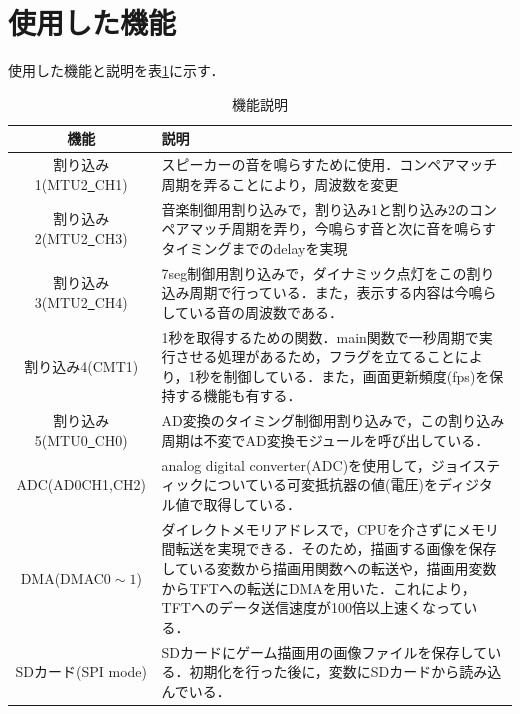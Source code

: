 \documentclass[a4paper,11pt]{ltjsarticle}
\begin{document}
\section{使用した機能}
使用した機能と説明を表\ref{tab:table1}に示す．
\begin{table}[htbp]
  \centering
  \caption{機能説明}
  \label{tab:table1}
  \begin{tabular}{|c|p{10cm}|}
    \hline
    機能                          & 説明                                                                                                                           \\
    \hline
    割り込み1(MTU2\underline{~}CH1) & スピーカーの音を鳴らすために使用．コンペアマッチ周期を弄ることにより，周波数を変更                                                                                    \\
    \hline
    割り込み2(MTU2\underline{~}CH3) & 音楽制御用割り込みで，割り込み1と割り込み2のコンペアマッチ周期を弄り，今鳴らす音と次に音を鳴らすタイミングまでのdelayを実現                                                            \\
    \hline
    割り込み3(MTU2\underline{~}CH4) & 7seg制御用割り込みで，ダイナミック点灯をこの割り込み周期で行っている．また，表示する内容は今鳴らしている音の周波数である．                                                              \\
    \hline
    割り込み4(CMT1)                 & 1秒を取得するための関数．main関数で一秒周期で実行させる処理があるため，フラグを立てることにより，1秒を制御している．また，画面更新頻度(fps)を保持する機能も有する．                                      \\
    \hline
    割り込み5(MTU0\underline{~}CH0) & AD変換のタイミング制御用割り込みで，この割り込み周期は不変でAD変換モジュールを呼び出している．                                                                            \\
    \hline
    ADC(AD0\underbar{~}CH1,CH2) & analog digital converter(ADC)を使用して，ジョイスティックについている可変抵抗器の値(電圧)をディジタル値で取得している．                                                  \\
    \hline
    DMA(DMAC$0 \sim 1$)         & ダイレクトメモリアドレスで，CPUを介さずにメモリ間転送を実現できる．そのため，描画する画像を保存している変数から描画用関数への転送や，描画用変数からTFTへの転送にDMAを用いた．これにより，TFTへのデータ送信速度が100倍以上速くなっている． \\
    \hline
    SDカード(SPI mode)             & SDカードにゲーム描画用の画像ファイルを保存している．初期化を行った後に，変数にSDカードから読み込んでいる．                                                                      \\

\end{tabular}
\end{table}
\end{document}

